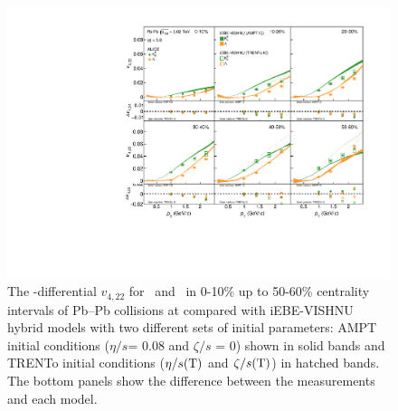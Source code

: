 \documentclass[ALICE,manyauthors]{cernphprep}
\begin{document}
 \begin{figure}[h]
\begin{center}
\includegraphics[scale=0.73]{figures/model/TrentoAndAMPT_v422_gap00_LambdaK0s.pdf}
\end{center}
\caption{The \pT-differential $v_{4,22}$ for \Ks~and \lambdas~in 0-10\% up to 50-60\% centrality intervals of Pb--Pb collisions at \sNN compared with iEBE-VISHNU hybrid models with two different sets of initial parameters: AMPT initial conditions ($\eta/s$= 0.08 and $\zeta/s$ = 0) shown in solid bands and TRENTo initial conditions ($\eta/s({\rm T})$ and $\zeta/s({\rm T})$) in hatched bands. The bottom panels show the difference between the measurements and each model.}
\label{v422_model_KL}
\end{figure}
\end{document}
